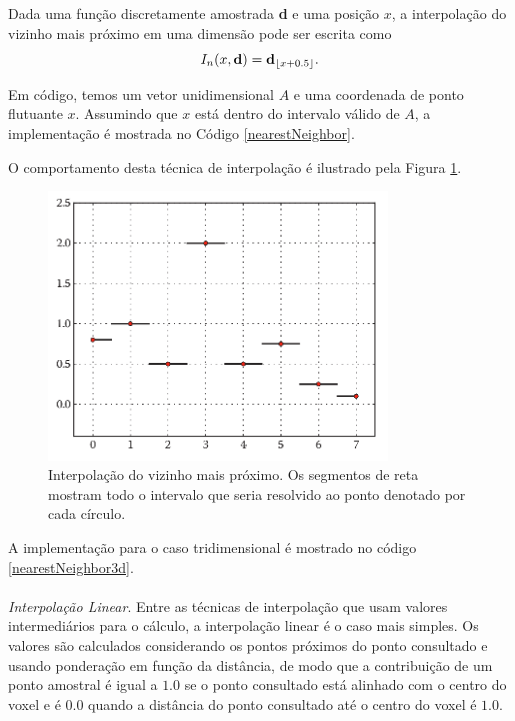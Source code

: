 \documentclass[12pt, a4paper, oneside]{book}
\DeclarePairedDelimiter{\floor}{\lfloor}{\rfloor}
\begin{document}
Dada uma função discretamente amostrada {\bf d} e uma posição $x$, a interpolação do vizinho mais próximo em uma dimensão pode ser escrita como
\[
I_{n}(x, {\bf d}) = {\bf d}_{\floor*{x+0.5}}.
\]

Em código, temos um vetor unidimensional $A$ e uma coordenada de ponto flutuante $x$. Assumindo que $x$ está dentro do intervalo válido de $A$, a implementação é mostrada no Código \ref{nearestNeighbor}.



O comportamento desta técnica de interpolação é ilustrado pela Figura \ref{nearestNeighborImage}.

\begin{figure}[!htb]
\center
\includegraphics[width=9cm]{nearestNeighbor}
\caption{Interpolação do vizinho mais próximo. Os segmentos de reta mostram todo o intervalo que seria resolvido ao ponto denotado por cada círculo.}
\label{nearestNeighborImage}
\end{figure}

A implementação para o caso tridimensional é mostrado no código \ref{nearestNeighbor3d}. \\
\\




\emph{Interpolação Linear}. Entre as técnicas de interpolação que usam valores intermediários para o cálculo, a interpolação linear é o caso mais simples. Os valores são calculados considerando os pontos próximos do ponto consultado e usando ponderação em função da distância, de modo que a contribuição de um ponto amostral é igual a $1.0$ se o ponto consultado está alinhado com o centro do voxel e é $0.0$ quando a distância do ponto consultado até o centro do voxel é $1.0$.
\end{document}
